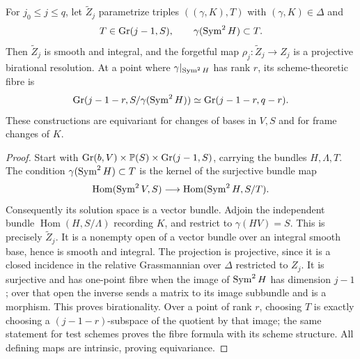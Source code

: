 \begin{theorem}
\label{thm:flag-resolution}
For $j_0\le j\le q$, let $\widetilde Z_j$ parametrize triples
$((\gamma,K),T)$ with $(\gamma,K)\in\Delta$ and
\[
 T\in\operatorname{Gr}(j-1,S),\qquad \gamma(\operatorname{Sym}^2H)\subset T.
\]
Then $\widetilde Z_j$ is smooth and integral, and the forgetful
map $\rho_j:\widetilde Z_j\to Z_j$ is a projective birational
resolution. At a point where $\gamma|_{\operatorname{Sym}^2H}$ has rank $r$,
its scheme-theoretic fibre is
\begin{equation}\label{eq:flag-resolution-fibre}
 \operatorname{Gr}(j-1-r,S/\gamma(\operatorname{Sym}^2H))
            \simeq\operatorname{Gr}(j-1-r,q-r).
\end{equation}
These constructions are equivariant for changes of bases in $V,S$
and for frame changes of $K$.
\end{theorem}
\begin{proof}
Start with
$\operatorname{Gr}(b,V)\times\mathbb P(S)\times\operatorname{Gr}(j-1,S)$, carrying the bundles
$H,\Lambda,T$. The condition
$\gamma(\operatorname{Sym}^2H)\subset T$ is the kernel of the surjective
bundle map
\[
 \operatorname{Hom}(\operatorname{Sym}^2V,S)
       \longrightarrow\operatorname{Hom}(\operatorname{Sym}^2H,S/T).
\]
Consequently its solution space is a vector bundle. Adjoin the
independent bundle $\operatorname{Hom}(H,S/\Lambda)$ recording $K$,
and restrict to $\gamma(HV)=S$. This is precisely
$\widetilde Z_j$. It is a nonempty open of a vector bundle over an
integral smooth base, hence is smooth and integral. The projection
is projective, since it is a closed incidence in the relative
Grassmannian over $\Delta$ restricted to $Z_j$. It is surjective
and has one-point fibre when the image of $\operatorname{Sym}^2H$ has dimension
$j-1$; over that open the inverse sends a matrix to its image
subbundle and is a morphism. This proves birationality. Over a
point of rank $r$, choosing $T$ is exactly choosing a
$(j-1-r)$-subspace of the quotient by that image; the same statement
for test schemes proves the fibre formula with its scheme structure.
All defining maps are intrinsic, proving equivariance.
\end{proof}

